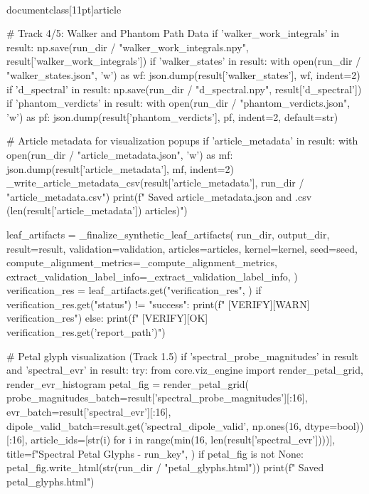 \\documentclass[11pt]{article}
\begin{document}
\begin{CodeBlock}
                # Track 4/5: Walker and Phantom Path Data
                if 'walker_work_integrals' in result:
                    np.save(run_dir / "walker_work_integrals.npy", result['walker_work_integrals'])
                if 'walker_states' in result:
                    with open(run_dir / "walker_states.json", 'w') as wf:
                        json.dump(result['walker_states'], wf, indent=2)
                if 'd_spectral' in result:
                    np.save(run_dir / "d_spectral.npy", result['d_spectral'])
                if 'phantom_verdicts' in result:
                    with open(run_dir / "phantom_verdicts.json", 'w') as pf:
                        json.dump(result['phantom_verdicts'], pf, indent=2, default=str)

                # Article metadata for visualization popups
                if 'article_metadata' in result:
                    with open(run_dir / "article_metadata.json", 'w') as mf:
                        json.dump(result['article_metadata'], mf, indent=2)
                    _write_article_metadata_csv(result['article_metadata'], run_dir / "article_metadata.csv")
                    print(f"    Saved article_metadata.json and .csv ({len(result['article_metadata'])} articles)")

                leaf_artifacts = _finalize_synthetic_leaf_artifacts(
                    run_dir,
                    output_dir,
                    result=result,
                    validation=validation,
                    articles=articles,
                    kernel=kernel,
                    seed=seed,
                    compute_alignment_metrics=_compute_alignment_metrics,
                    extract_validation_label_info=_extract_validation_label_info,
                )
                verification_res = leaf_artifacts.get("verification_res", {})
                if verification_res.get("status") != "success":
                    print(f"    [VERIFY][WARN] {verification_res}")
                else:
                    print(f"    [VERIFY][OK] {verification_res.get('report_path')}")

                # Petal glyph visualization (Track 1.5)
                if 'spectral_probe_magnitudes' in result and 'spectral_evr' in result:
                    try:
                        from core.viz_engine import render_petal_grid, render_evr_histogram
                        petal_fig = render_petal_grid(
                            probe_magnitudes_batch=result['spectral_probe_magnitudes'][:16],
                            evr_batch=result['spectral_evr'][:16],
                            dipole_valid_batch=result.get('spectral_dipole_valid', np.ones(16, dtype=bool))[:16],
                            article_ids=[str(i) for i in range(min(16, len(result['spectral_evr'])))],
                            title=f"Spectral Petal Glyphs - {run_key}",
                        )
                        if petal_fig is not None:
                            petal_fig.write_html(str(run_dir / "petal_glyphs.html"))
                            print(f"    Saved petal_glyphs.html")


\end{CodeBlock}
\end{document}
